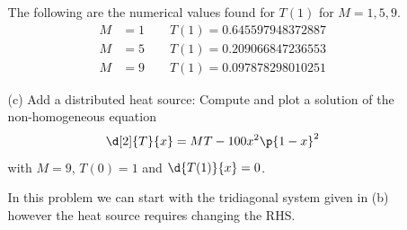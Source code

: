 \documentclass[11pt, oneside]{article}
\begin{document}
\begin{enumerate}
\begin{enumerate}
\begin{center}
        \end{center}
        The following are the numerical values found for $T(1)$ for
        $M = 1, 5, 9$.
        \begin{align*}
          M &= 1 \qquad T(1) = 0.645597948372887 \\
          M &= 5 \qquad T(1) = 0.209066847236553 \\
          M &= 9 \qquad T(1) = 0.097878298010251
        \end{align*}

      \item[(c)] %
        Add a distributed heat source: Compute and plot a solution of the
        non-homogeneous equation
        \[
          \d[2]{T}{x} = MT - 100 x^2 \p{1 - x}^2
        \]
        with $M = 9$, $T(0) = 1$ and $\d{T(1)}{x} = 0$.

        In this problem we can start with the tridiagonal system given in (b)
        however the heat source requires changing the RHS.\


\end{enumerate}
\end{enumerate}
\end{document}
